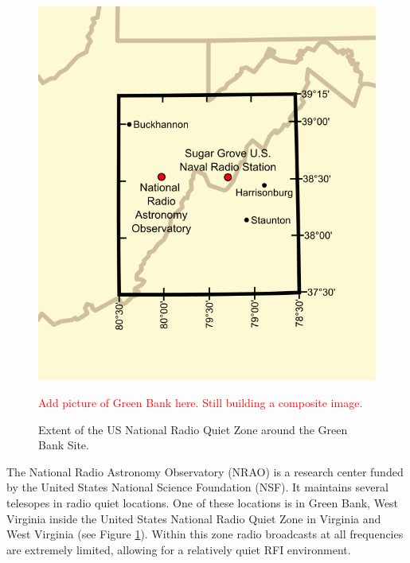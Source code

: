 \begin{figure}[htb]
\centering
\begin{minipage}[b]{0.47\textwidth}
\centering
\includegraphics[width=0.95\linewidth]{RFI_testing/figures/National_Radio_Quiet_Zone.png}
\caption{Extent of the US National Radio Quiet Zone around the Green Bank Site.}
\label{Fig:nrqz}
\end{minipage}%
\begin{minipage}[b]{0.02\textwidth}
\hspace{1cm}
\end{minipage}%
\begin{minipage}[b]{0.47\textwidth}
\centering
\textcolor{red}{Add picture of Green Bank here. Still building a composite image.}
\end{minipage}
\end{figure}

The National Radio Astronomy Observatory (NRAO) is a research center funded by the United States National Science Foundation (NSF). It maintains several telesopes in radio quiet locations. One of these locations is in Green Bank, West Virginia inside the United States National Radio Quiet Zone in Virginia and West Virginia (see Figure \ref{Fig:nrqz}). Within this zone radio broadcasts at all frequencies are extremely limited, allowing for a relatively quiet RFI environment.

